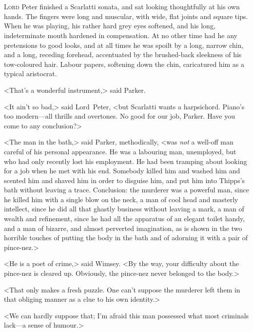 \chapter[Chapter \thechapter]{}
\lettrine[lines=4]{L}{ord} Peter finished a Scarlatti sonata, and sat looking thoughtfully at his own hands. The fingers were long and muscular, with wide, flat joints and square tips. When he was playing, his rather hard grey eyes softened, and his long, indeterminate mouth hardened in compensation. At no other time had he any pretensions to good looks, and at all times he was spoilt by a long, narrow chin, and a long, receding forehead, accentuated by the brushed-back sleekness of his tow-coloured hair. Labour papers, softening down the chin, caricatured him as a typical aristocrat.

<That's a wonderful instrument,> said Parker.

<It ain't so bad,> said Lord~Peter, <but Scarlatti wants a harpsichord. Piano's too modern—all thrills and overtones. No good for our job, Parker. Have you come to any conclusion?>

<The man in the bath,> said Parker, methodically, <was \textit{not} a well-off man careful of his personal appearance. He was a labouring man, unemployed, but who had only recently lost his employment. He had been tramping about looking for a job when he met with his end. Somebody killed him and washed him and scented him and shaved him in order to disguise him, and put him into Thipps's bath without leaving a trace. Conclusion: the murderer was a powerful man, since he killed him with a single blow on the neck, a man of cool head and masterly intellect, since he did all that ghastly business without leaving a mark, a man of wealth and refinement, since he had all the apparatus of an elegant toilet handy, and a man of bizarre, and almost perverted imagination, as is shown in the two horrible touches of putting the body in the bath and of adorning it with a pair of pince-nez.>

<He is a poet of crime,> said Wimsey. <By the way, your difficulty about the pince-nez is cleared up. Obviously, the pince-nez never belonged to the body.>

<That only makes a fresh puzzle. One can't suppose the murderer left them in that obliging manner as a clue to his own identity.>

<We can hardly suppose that; I'm afraid this man possessed what most criminals lack—a sense of humour.>

